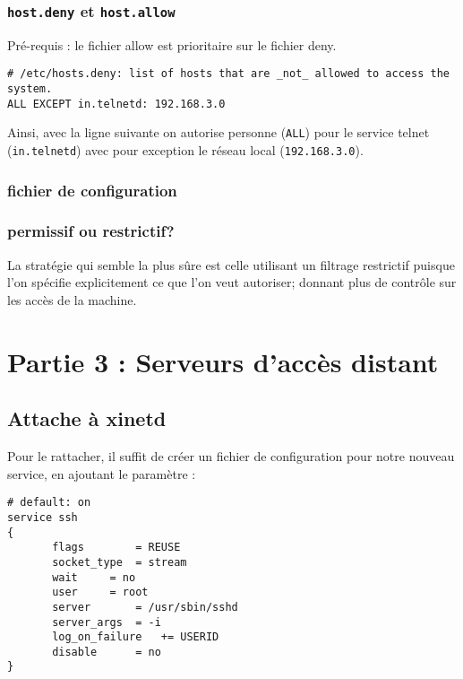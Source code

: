 \documentclass[12pt,a4paper,notitlepage]{article}
\begin{document}
\subsubsection{\texttt{host.deny} et \texttt{host.allow}}

\noindent Pré-requis : le fichier allow est prioritaire sur le fichier deny.\\

\begin{lstlisting}
# /etc/hosts.deny: list of hosts that are _not_ allowed to access the system.
ALL EXCEPT in.telnetd: 192.168.3.0
\end{lstlisting}
Ainsi, avec la ligne suivante on autorise personne (\texttt{ALL}) pour le service telnet (\texttt{in.telnetd}) avec pour exception le réseau local (\texttt{192.168.3.0}).


\subsubsection{fichier de configuration}


\subsubsection{permissif ou restrictif?}



La stratégie qui semble la plus sûre est celle utilisant un filtrage restrictif puisque l'on spécifie explicitement ce que l'on veut autoriser; donnant plus de contrôle sur les accès de la machine.


\section{Partie 3 : Serveurs d'accès distant}

\subsection{Attache à xinetd}

Pour le rattacher, il suffit de créer un fichier de configuration pour notre nouveau service, en ajoutant le paramètre :\\

\begin{lstlisting}
# default: on
service ssh
{
       flags		= REUSE
       socket_type	= stream
       wait		= no
       user		= root
       server		= /usr/sbin/sshd
       server_args	= -i
       log_on_failure	+= USERID
       disable		= no
}
\end{lstlisting}
\end{document}
